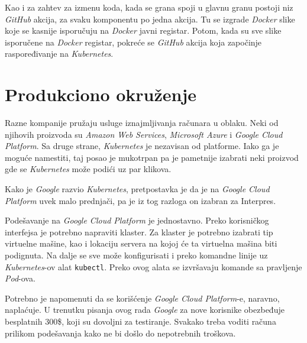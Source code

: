 Kao i za zahtev za izmenu koda, kada se grana spoji u glavnu granu 
postoji niz \textit{GitHub} akcija, za svaku komponentu po jedna akcija.
Tu se izgrade \textit{Docker} slike koje se kasnije isporučuju na 
\textit{Docker} javni registar. Potom, kada su sve slike isporučene na 
\textit{Docker} registar, pokreće se \textit{GitHub} akcija koja započinje 
raspoređivanje na \textit{Kubernetes}.

\section{Produkciono okruženje}
Razne kompanije pružaju usluge iznajmljivanja računara u oblaku. Neki od 
njihovih proizvoda su \textit{Amazon Web Services}, \textit{Microsoft Azure}
i \textit{Google Cloud Platform}. Sa druge strane, \textit{Kubernetes} je 
nezavisan od platforme. Iako ga je moguće namestiti, taj posao je mukotrpan 
pa je pametnije izabrati neki proizvod gde se \textit{Kubernetes} može 
podići uz par klikova. 

Kako je \textit{Google} razvio \textit{Kubernetes}, pretpostavka je da je 
na \textit{Google Cloud Platform} uvek malo prednjači, pa je iz tog razloga 
on izabran za Interpres.

Podešavanje na \textit{Google Cloud Platform} je jednostavno. Preko 
korisničkog interfejsa je potrebno napraviti klaster. Za klaster je 
potrebno izabrati tip virtuelne mašine, kao i lokaciju servera na kojoj 
će ta virtuelna mašina biti podignuta. Na dalje se sve može konfigurisati 
i preko komandne linije uz \textit{Kubernetes}-ov alat \texttt{kubectl}.
Preko ovog alata se izvršavaju komande sa pravljenje \textit{Pod}-ova.

Potrebno je napomenuti da se korišćenje \textit{Google Cloud Platform}-e,
naravno, naplaćuje. U trenutku pisanja ovog rada \textit{Google} za nove 
korisnike obezbeđuje besplatnih 300\$, koji su dovoljni za testiranje.
Svakako treba voditi računa prilikom podešavanja kako ne bi došlo do 
nepotrebnih troškova.

